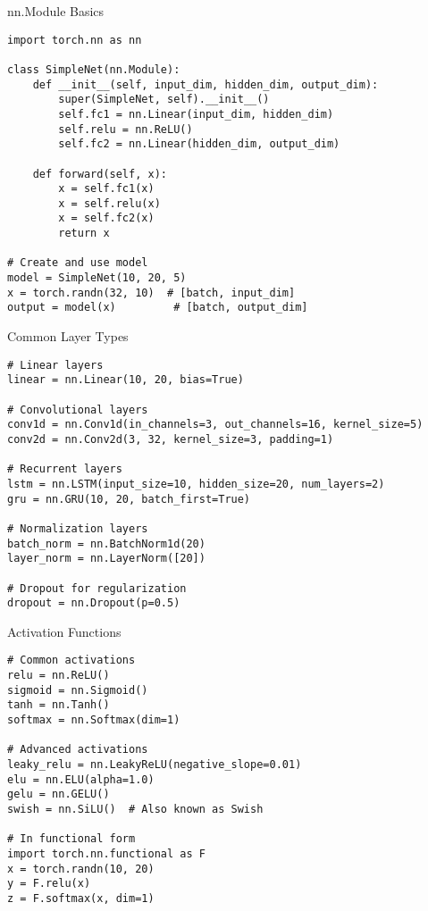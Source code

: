 \documentclass[aspectratio=169,10pt]{beamer}
\begin{document}
\begin{frame}[fragile]{nn.Module Basics}
\begin{lstlisting}
import torch.nn as nn

class SimpleNet(nn.Module):
    def __init__(self, input_dim, hidden_dim, output_dim):
        super(SimpleNet, self).__init__()
        self.fc1 = nn.Linear(input_dim, hidden_dim)
        self.relu = nn.ReLU()
        self.fc2 = nn.Linear(hidden_dim, output_dim)
    
    def forward(self, x):
        x = self.fc1(x)
        x = self.relu(x)
        x = self.fc2(x)
        return x

# Create and use model
model = SimpleNet(10, 20, 5)
x = torch.randn(32, 10)  # [batch, input_dim]
output = model(x)         # [batch, output_dim]
\end{lstlisting}
\end{frame}

\begin{frame}[fragile]{Common Layer Types}
\begin{lstlisting}
# Linear layers
linear = nn.Linear(10, 20, bias=True)

# Convolutional layers
conv1d = nn.Conv1d(in_channels=3, out_channels=16, kernel_size=5)
conv2d = nn.Conv2d(3, 32, kernel_size=3, padding=1)

# Recurrent layers
lstm = nn.LSTM(input_size=10, hidden_size=20, num_layers=2)
gru = nn.GRU(10, 20, batch_first=True)

# Normalization layers
batch_norm = nn.BatchNorm1d(20)
layer_norm = nn.LayerNorm([20])

# Dropout for regularization
dropout = nn.Dropout(p=0.5)
\end{lstlisting}
\end{frame}

\begin{frame}[fragile]{Activation Functions}
\begin{lstlisting}
# Common activations
relu = nn.ReLU()
sigmoid = nn.Sigmoid()
tanh = nn.Tanh()
softmax = nn.Softmax(dim=1)

# Advanced activations
leaky_relu = nn.LeakyReLU(negative_slope=0.01)
elu = nn.ELU(alpha=1.0)
gelu = nn.GELU()
swish = nn.SiLU()  # Also known as Swish

# In functional form
import torch.nn.functional as F
x = torch.randn(10, 20)
y = F.relu(x)
z = F.softmax(x, dim=1)
\end{lstlisting}
\end{frame}
\end{document}
